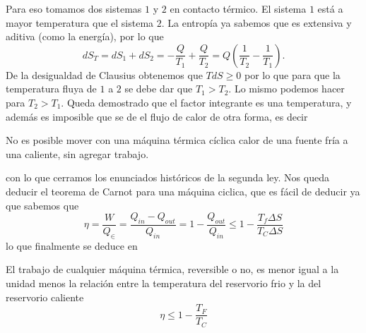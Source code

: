Para eso tomamos dos sistemas $1$ y $2$ en contacto térmico.
El sistema $1$ está a mayor temperatura que el sistema $2$. La entropía ya sabemos que es extensiva y aditiva (como la energía), por lo que
\[dS_{T} = dS_1 + dS_2 = -\frac{Q}{T_1} + \frac{Q}{T_2} = Q \left(\frac{1}{T_2} - \frac{1}{T_1}\right).\]
De la desigualdad de Clausius obtenemos que $T dS \geq 0$ por lo que para que la temperatura fluya de $1$ a $2$ se debe dar que $T_1 > T_2$.
Lo mismo podemos hacer para $T_2 > T_1$. Queda demostrado que el factor integrante es una temperatura, y además es imposible que se de el flujo de calor de otra forma, es decir
\begin{collorary}
No es posible mover con una máquina térmica cíclica calor de una fuente fría a una caliente, sin agregar trabajo.
\end{collorary}
con lo que cerramos los enunciados históricos de la segunda ley.
Nos queda deducir el teorema de Carnot para una máquina ciclica, que es fácil de deducir ya que sabemos que
\[\eta = \frac{W}{Q_{\in}} = \frac{Q_{in} - Q_{out}}{Q_{in}} = 1 - \frac{Q_{out}}{Q_{in}} \leq 1 - \frac{T_{f} \Delta S}{T_C \Delta S}\]
lo que finalmente se deduce en
\begin{collorary}
El trabajo de cualquier máquina térmica, reversible o no, es menor igual a la unidad menos la relación entre la temperatura del reservorio frio y la del reservorio caliente\
\begin{equation}
\eta \leq 1 - \frac{T_F}{T_C}
\end{equation}
\end{collorary}
